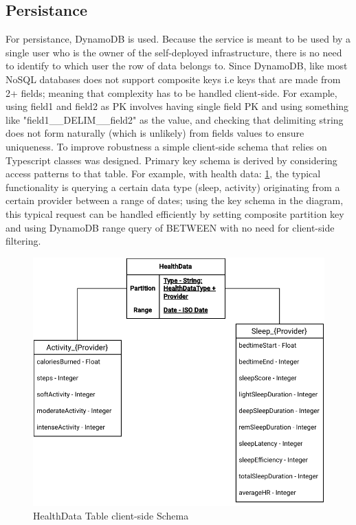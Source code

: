 \subsection{Persistance}
For persistance, DynamoDB is used. Because the service is meant to be used by a single user who is the owner of the self-deployed infrastructure, there is no need to identify to which user the row of data belongs to. Since DynamoDB, like most NoSQL databases does not support composite keys i.e keys that are made from 2+ fields; meaning that complexity has to be handled client-side. For example, using field1 and field2 as PK involves having single field PK and using something like "field1\_\_DELIM\_\_field2" as the value, and checking that delimiting string does not form naturally (which is unlikely) from fields values to ensure uniqueness. To improve robustness a simple client-side schema that relies on Typescript classes was designed. Primary key schema is derived by considering access patterns to that table. For example, with health data: \ref{fig:schema}, the typical functionality is querying a certain data type (sleep, activity) originating from a certain provider between a range of dates; using the key schema in the diagram, this typical request can be handled efficiently by setting composite partition key and using DynamoDB range query of BETWEEN with no need for client-side filtering. 
\begin{figure}
    
    \centering
    \includegraphics[width=\textwidth,height=\textheight,keepaspectratio]{../images/dataSchema.pdf}
    \caption{HealthData Table client-side Schema}
    \label{fig:schema}
    
\end{figure}
